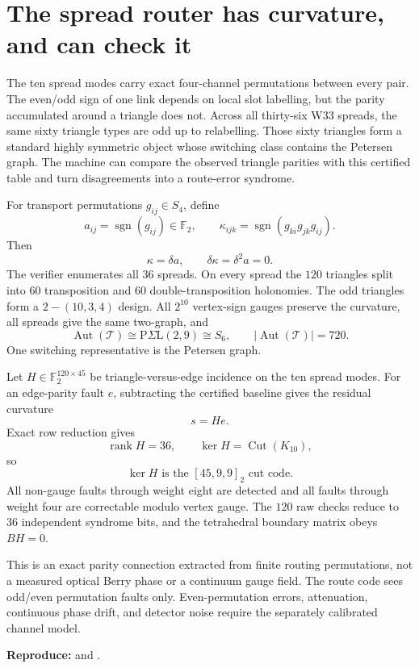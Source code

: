 \section{The spread router has curvature, and can check it}
\label{sec:bt2962-bt2965-router-curvature}

\begin{plain}
The ten spread modes carry exact four-channel permutations between every pair.
The even/odd sign of one link depends on local slot labelling, but the parity
accumulated around a triangle does not.  Across all thirty-six W33 spreads, the
same sixty triangle types are odd up to relabelling.  Those sixty triangles form
a standard highly symmetric object whose switching class contains the Petersen
graph.  The machine can compare the observed triangle parities with this
certified table and turn disagreements into a route-error syndrome.
\end{plain}

\begin{spec}
For transport permutations \(g_{ij}\in S_4\), define
\[
 a_{ij}=\operatorname{sgn}(g_{ij})\in\mathbb F_2,
 \qquad
 \kappa_{ijk}=\operatorname{sgn}(g_{ki}g_{jk}g_{ij}).
\]
Then
\[
 \kappa=\delta a,
 \qquad
 \delta\kappa=\delta^2a=0.
\]
The verifier enumerates all \(36\) spreads.  On every spread the \(120\)
triangles split into \(60\) transposition and \(60\) double-transposition
holonomies.  The odd triangles form a \(2-(10,3,4)\) design.  All \(2^{10}\)
vertex-sign gauges preserve the curvature, all spreads give the same two-graph,
and
\[
 \operatorname{Aut}(\mathcal T)
 \cong \mathrm{P}\Sigma\mathrm L(2,9)
 \cong S_6,
 \qquad |\operatorname{Aut}(\mathcal T)|=720.
\]
One switching representative is the Petersen graph.
\end{spec}

\begin{spec}
Let \(H\in\mathbb F_2^{120\times45}\) be triangle-versus-edge incidence on the
ten spread modes.  For an edge-parity fault \(e\), subtracting the certified
baseline gives the residual curvature
\[
 s=He.
\]
Exact row reduction gives
\[
 \operatorname{rank}H=36,
 \qquad
 \ker H=\operatorname{Cut}(K_{10}),
\]
so
\[
 \boxed{\ker H\text{ is the }[45,9,9]_2\text{ cut code}.}
\]
All non-gauge faults through weight eight are detected and all faults through
weight four are correctable modulo vertex gauge.  The \(120\) raw checks reduce
to \(36\) independent syndrome bits, and the tetrahedral boundary matrix obeys
\(BH=0\).
\end{spec}

\begin{gotwrong}
This is an exact parity connection extracted from finite routing permutations,
not a measured optical Berry phase or a continuum gauge field.  The route code
sees odd/even permutation faults only.  Even-permutation errors, attenuation,
continuous phase drift, and detector noise require the separately calibrated
channel model.
\end{gotwrong}

\noindent\textbf{Reproduce:}
 and
.
